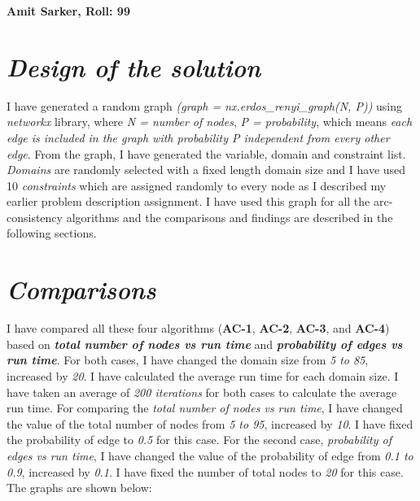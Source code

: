 \documentclass[12pt, english]{article}
\begin{document}
{\Large \textbf{Amit Sarker, Roll: 99}}
\section{\textit{Design of the solution}}
\par
I have generated a random graph \textit{(graph = nx.erdos\_renyi\_graph(N, P))} using \textit{networkx} library, where \textit{N = number of nodes}, \textit{P = probability}, which means \textit{each edge is included in the graph with probability P independent from every other edge}. From the graph, I have generated the variable, domain and constraint list. \textit{Domains} are randomly selected with a fixed length domain size and I have used 10 \textit{constraints} which are assigned randomly to every node as I described my earlier problem description assignment. I have used this graph for all the arc-consistency algorithms and the comparisons and findings are described in the following sections.

\section{\textit{Comparisons}}
\par
I have compared all these four algorithms (\textbf{AC-1}, \textbf{AC-2}, \textbf{AC-3}, and \textbf{AC-4}) based on \textit{\textbf{total number of nodes vs run time}} and \textit{\textbf{probability of edges vs run time}}. For both cases, I have changed the domain size from \textit{5 to 85}, increased by \textit{20}. I have calculated the average run time for each domain size. I have taken an average of \textit{200 iterations} for both cases to calculate the average run time. For comparing the \textit{total number of nodes vs run time}, I have changed the value of the total number of nodes from \textit{5 to 95}, increased by \textit{10}. I have fixed the probability of edge to \textit{0.5} for this case. For the second case, \textit{probability of edges vs run time}, I have changed the value of the probability of edge from \textit{0.1 to 0.9}, increased by \textit{0.1}. I have fixed the number of total nodes to \textit{20} for this case. The graphs are shown below:\\
\end{document}
